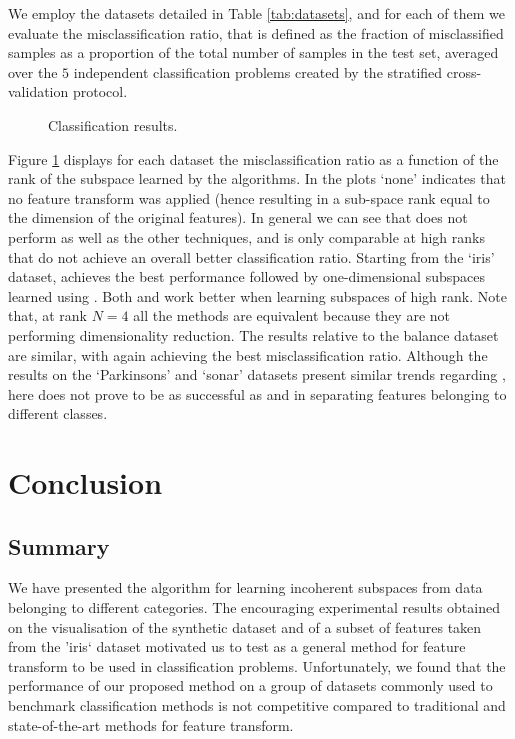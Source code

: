 \documentclass{article}
\def \nDim{N} 			%
\begin{document}
We employ the datasets detailed in Table \ref{tab:datasets}, and for each of them we evaluate the misclassification ratio, that is defined as the fraction of misclassified samples as a proportion of the total number of samples in the test set, averaged over the $5$ independent classification problems created by the stratified cross-validation protocol.
\begin{figure}
\centering
{}
\caption{\label{fig:class} Classification results.}
\end{figure}

Figure \ref{fig:class} displays for each dataset the misclassification ratio as a function of the rank of the subspace learned by the algorithms. In the plots `none' indicates that no feature transform was applied (hence resulting in a sub-space rank equal to the dimension of the original features). In general we can see that  does not perform as well as the other techniques, and is only comparable at high ranks that do not achieve an overall better classification ratio. Starting from the `iris' dataset,  achieves the best performance followed by one-dimensional subspaces learned using . Both  and  work better when learning subspaces of high rank. Note that, at rank $\nDim=4$ all the methods are equivalent because they are not performing dimensionality reduction. The results relative to the balance dataset are similar, with again  achieving the best misclassification ratio. Although the results on the `Parkinsons' and `sonar' datasets present similar trends regarding , here  does not prove to be as successful as  and  in separating features belonging to different classes. 

\section{Conclusion}\label{sec:end}
\subsection{Summary}
We have presented the  algorithm for learning incoherent subspaces from data belonging to different categories. The encouraging experimental results obtained on the visualisation of the synthetic dataset and of a subset of features taken from the 'iris` dataset motivated us to test  as a general method for feature transform to be used in classification problems. Unfortunately, we found that the performance of our proposed method on a group of datasets commonly used to benchmark classification methods is not competitive compared to traditional and state-of-the-art methods for feature transform. 
\end{document}
